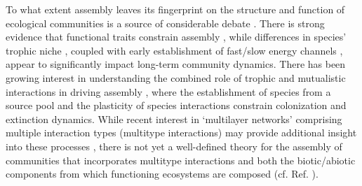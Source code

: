 \documentclass[twocolumn,preprintnumbers,amsmath,amssymb,superscriptaddress,linenumbers]{revtex4-1}
\begin{document}
To what extent assembly leaves its fingerprint on the structure and function of ecological communities is a source of considerable debate \cite{Hubbell2001,Tilman2004,Fukami2015}.
There is strong evidence that functional traits constrain assembly \cite{Kraft2008,ODwyer2009,Fukami2015}, while differences in species' trophic niche \cite{Brown2002,Piechnik2008}, coupled with early establishment of fast/slow energy channels \cite{Fahimipour2014}, appear to significantly impact long-term community dynamics.
There has been growing interest in understanding the combined role of trophic and mutualistic interactions in driving assembly \cite{Barbier2018,Campbell2011}, where the establishment of species from a source pool \cite{Luh1993,Law1996,Campbell2011} and the plasticity of species interactions \cite{Valdovinos2010,RamosJiliberto2012,Valdovinos2016,Ponisio2019} constrain colonization and extinction dynamics.
While recent interest in `multilayer networks' comprising multiple interaction types (multitype interactions) may provide additional insight into these processes \cite{Kefi2016,Pilosof2017}, there is not yet a well-defined theory for the assembly of communities that incorporates multitype interactions and both the biotic/abiotic components from which functioning ecosystems are composed (cf. Ref. \cite{Odum1969}).


\end{document}
